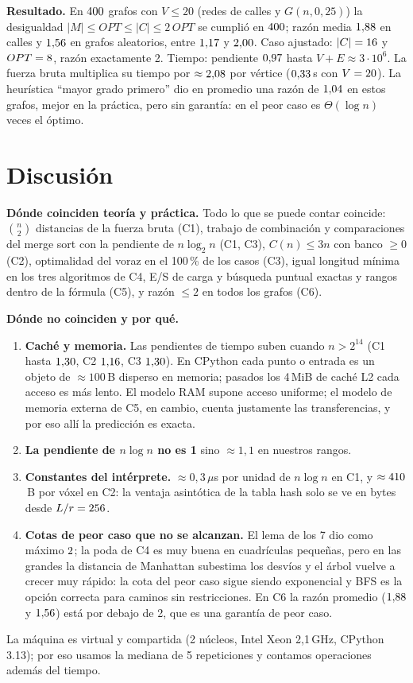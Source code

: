\documentclass[11pt,letterpaper]{article}
\theoremstyle{plain}
\theoremstyle{definition}
\newcommand{\Th}{\Theta}
\begin{document}
\textbf{Resultado.} En $400$ grafos con $V\le20$ (redes de calles y $G(n,0{,}25)$) la desigualdad
$|M|\le OPT\le|C|\le2\,OPT$ se cumplió en $400$; razón media $1{,}88$ en calles y
$1{,}56$ en grafos aleatorios, entre $1{,}17$ y $2{,}00$. Caso ajustado: $|C|=16$ y
$OPT=8$, razón exactamente 2. Tiempo: pendiente $0{,}97$ hasta $V+E\approx3\cdot10^6$.
La fuerza bruta multiplica su tiempo por $\approx2{,}08$ por vértice ($0{,}33$\,s con
$V=20$). La heurística ``mayor grado primero'' dio en promedio una razón de $1{,}04$
en estos grafos, mejor en la práctica, pero sin garantía: en el peor caso es $\Th(\log n)$ veces el óptimo.
\section{Discusión}\label{sec:discusion}

\textbf{Dónde coinciden teoría y práctica.} Todo lo que se puede contar coincide: $\binom n2$ distancias de
la fuerza bruta (C1), trabajo de combinación y comparaciones del merge sort con la pendiente de
$n\log_2 n$ (C1, C3), $C(n)\le3n$ con banco $\ge0$ (C2), optimalidad del voraz en el 100\,\% de los casos
(C3), igual longitud mínima en los tres algoritmos de C4, E/S de carga y búsqueda puntual exactas y rangos
dentro de la fórmula (C5), y razón $\le2$ en todos los grafos (C6).

\textbf{Dónde no coinciden y por qué.}
\begin{enumerate}
  \item \textbf{Caché y memoria.} Las pendientes de tiempo suben cuando $n>2^{14}$ (C1 hasta
  $1{,}30$, C2 $1{,}16$, C3 $1{,}30$). En CPython cada punto o entrada es un objeto
  de $\approx100$\,B disperso en memoria; pasados los 4\,MiB de caché L2 cada acceso es más lento. El
  modelo RAM supone acceso uniforme; el modelo de memoria externa de C5, en cambio, cuenta justamente
  las transferencias, y por eso allí la predicción es exacta.
  \item \textbf{La pendiente de $n\log n$ no es 1} sino $\approx1{,}1$ en nuestros rangos.
  \item \textbf{Constantes del intérprete.} $\approx0{,}3\,\mu$s por unidad de $n\log n$ en C1, y
  $\approx410$\,B por vóxel en C2: la ventaja asintótica de la tabla hash solo se ve en bytes
  desde $L/r=256$.
  \item \textbf{Cotas de peor caso que no se alcanzan.} El lema de los 7 dio como máximo
  $2$; la poda de C4 es muy buena en cuadrículas pequeñas, pero en las grandes la distancia
  de Manhattan subestima los desvíos y el árbol vuelve a crecer muy rápido: la cota del peor caso sigue
  siendo exponencial y BFS es la opción correcta para caminos sin restricciones. En C6 la razón promedio
  ($1{,}88$ y $1{,}56$) está por debajo de 2, que es una garantía de peor caso.
\end{enumerate}
La máquina es virtual y compartida (2 núcleos, Intel Xeon 2,1\,GHz, CPython 3.13); por eso usamos la
mediana de 5 repeticiones y contamos operaciones además del tiempo.
\end{document}
